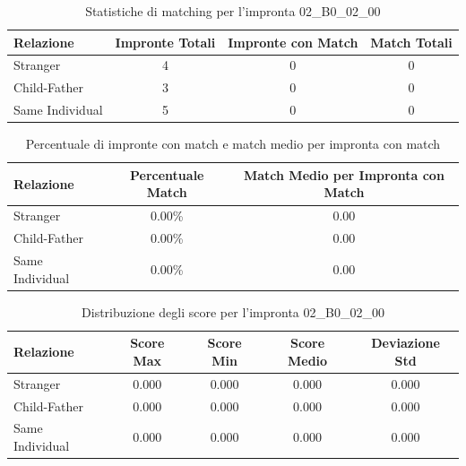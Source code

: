 \begin{table}[htbp]
\centering
\caption{Statistiche di matching per l'impronta 02\_B0\_02\_00}
\label{tab:results_02_B0_02_00}
\begin{tabular}{|l|c|c|c|}
\hline
\textbf{Relazione} & \textbf{Impronte Totali} & \textbf{Impronte con Match} & \textbf{Match Totali} \\
\hline
Stranger & 4 & 0 & 0 \\
\hline
Child-Father & 3 & 0 & 0 \\
\hline
Same Individual & 5 & 0 & 0 \\
\hline
\end{tabular}
\end{table}


\begin{table}[htbp]
\centering
\caption{Percentuale di impronte con match e match medio per impronta con match}
\label{tab:match_percentage_02_B0_02_00}
\begin{tabular}{|l|c|c|}
\hline
\textbf{Relazione} & \textbf{Percentuale Match} & \textbf{Match Medio per Impronta con Match} \\
\hline
Stranger & 0.00\% & 0.00 \\
\hline
Child-Father & 0.00\% & 0.00 \\
\hline
Same Individual & 0.00\% & 0.00 \\
\hline
\end{tabular}
\end{table}


\begin{table}[htbp]
\centering
\caption{Distribuzione degli score per l'impronta 02\_B0\_02\_00}
\label{tab:scores_02_B0_02_00}
\begin{tabular}{|l|c|c|c|c|}
\hline
\textbf{Relazione} & \textbf{Score Max} & \textbf{Score Min} & \textbf{Score Medio} & \textbf{Deviazione Std} \\
\hline
Stranger & 0.000 & 0.000 & 0.000 & 0.000 \\
\hline
Child-Father & 0.000 & 0.000 & 0.000 & 0.000 \\
\hline
Same Individual & 0.000 & 0.000 & 0.000 & 0.000 \\
\hline
\end{tabular}
\end{table}

